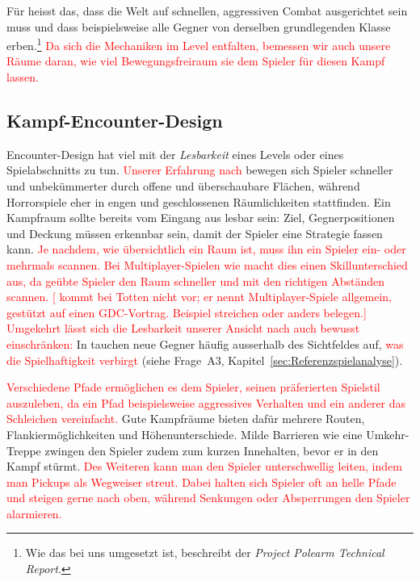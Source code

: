 \documentclass[../Main.tex]{subfiles}
\begin{document}
Für  heisst das, dass die Welt auf schnellen, aggressiven Combat ausgerichtet sein muss und dass beispielsweise alle Gegner von derselben grundlegenden Klasse erben.\textcolor{red}{\footnote{Wie das bei uns umgesetzt ist, beschreibt der \textit{Project Polearm Technical Report}.}} \textcolor{red}{Da sich die Mechaniken im Level entfalten, bemessen wir auch unsere Räume daran, wie viel Bewegungsfreiraum sie dem Spieler für diesen Kampf lassen.}

\subsection{Kampf-Encounter-Design} \label{sec:Encounter}
Encounter-Design hat viel mit der \textit{Lesbarkeit} eines Levels oder eines Spielabschnitts zu tun. \textcolor{red}{Unserer Erfahrung nach} bewegen sich Spieler schneller und unbekümmerter durch offene und überschaubare Flächen, während Horrorspiele eher in engen und geschlossenen Räumlichkeiten stattfinden. Ein Kampfraum sollte bereits vom Eingang aus lesbar sein: Ziel, Gegnerpositionen und Deckung müssen erkennbar sein, damit der Spieler eine Strategie fassen kann.\autocite{gdc_horizonquests2018} \textcolor{red}{Je nachdem, wie übersichtlich ein Raum ist, muss ihn ein Spieler ein- oder mehrmals scannen. Bei Multiplayer-Spielen wie \autocite{valve_counterstrike_2000} macht dies einen Skillunterschied aus, da geübte Spieler den Raum schneller und mit den richtigen Abständen scannen.\autocite[122--123]{totten2014architectural} \textcolor{red}{[ kommt bei Totten nicht vor; er nennt Multiplayer-Spiele allgemein, gestützt auf einen GDC-Vortrag. Beispiel streichen oder anders belegen.]}} \textcolor{red}{Umgekehrt lässt sich die Lesbarkeit unserer Ansicht nach auch bewusst einschränken:} In  tauchen neue Gegner häufig ausserhalb des Sichtfeldes auf, \textcolor{red}{was die Spielhaftigkeit verbirgt} (siehe Frage~A3, Kapitel~\ref{sec:Referenzspielanalyse}).

\textcolor{red}{Verschiedene Pfade ermöglichen es dem Spieler, seinen präferierten Spielstil auszuleben, da ein Pfad beispielsweise aggressives Verhalten und ein anderer das Schleichen vereinfacht.\autocite{gdc_tenprinciples2010}} Gute Kampfräume bieten dafür mehrere Routen, Flankiermöglichkeiten und Höhenunterschiede. Milde Barrieren wie eine Umkehr-Treppe zwingen den Spieler zudem zum kurzen Innehalten, bevor er in den Kampf stürmt.\autocite{gdc_horizonquests2018} \textcolor{red}{Des Weiteren kann man den Spieler unterschwellig leiten, indem man Pickups als Wegweiser streut. Dabei halten sich Spieler oft an helle Pfade und steigen gerne nach oben, während Senkungen oder Absperrungen den Spieler alarmieren.\autocite[240, 245, 251]{rogers2014levelup}}
\end{document}
